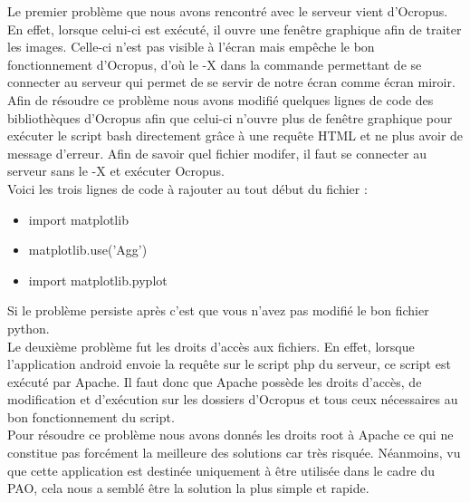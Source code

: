 Le premier problème que nous avons rencontré avec le serveur vient d'Ocropus. En effet, lorsque celui-ci est exécuté, il ouvre une fenêtre graphique afin de traiter les images. Celle-ci n'est pas visible à l'écran mais empêche le bon fonctionnement d'Ocropus, d'où le -X dans la commande permettant de se connecter au serveur qui permet de se servir de notre écran comme écran miroir.\\
Afin de résoudre ce problème nous avons modifié quelques lignes de code des bibliothèques d'Ocropus afin que celui-ci n'ouvre plus de fenêtre graphique pour exécuter le script bash directement grâce à une requête HTML et ne plus avoir de message d'erreur. Afin de savoir quel fichier modifer, il faut se connecter au serveur sans le -X et exécuter Ocropus.\\
Voici les trois lignes de code à rajouter au tout début du fichier :
\begin{itemize}
 \item import matplotlib
 \item matplotlib.use('Agg')
 \item import matplotlib.pyplot
\end{itemize}
Si le problème persiste après c'est que vous n'avez pas modifié le bon fichier python.\\

Le deuxième problème fut les droits d'accès aux fichiers. En effet, lorsque l'application android envoie la requête sur le script php du serveur, ce script est exécuté par Apache. Il faut donc que Apache possède les droits d'accès, de modification et d'exécution sur les dossiers d'Ocropus et tous ceux nécessaires au bon fonctionnement du script.\\
Pour résoudre ce problème nous avons donnés les droits root à Apache ce qui ne constitue pas forcément la meilleure des solutions car très risquée. Néanmoins, vu que cette application est destinée uniquement à être utilisée dans le cadre du PAO, cela nous a semblé être la solution la plus simple et rapide.